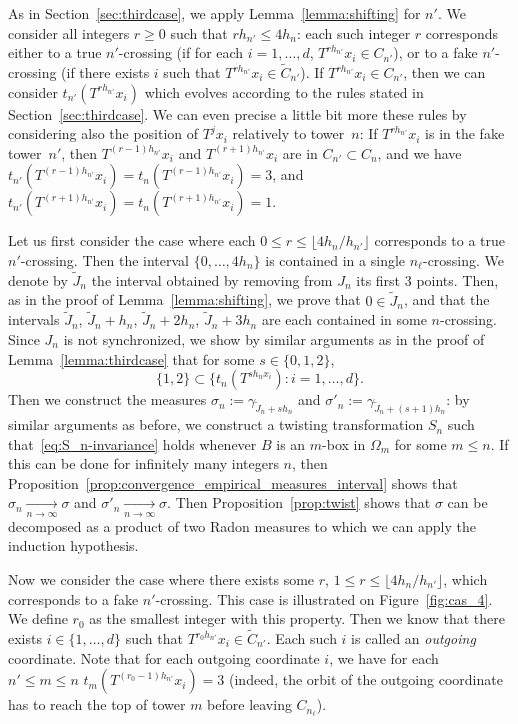 \documentclass[AHL,Unicode,longabstracts]{cedram}
\newcommand{\egdef}{:=}
\newcommand{\tend}[3][]{\xrightarrow[#2\to#3]{#1}}
\newcommand{\ovC}{\Omega}
\begin{document}
As in Section~\ref{sec:thirdcase}, we apply Lemma~\ref{lemma:shifting} for $n'$. We consider all integers $r\ge 0$ such that $rh_{n'}\le 4 h_n$: each such integer $r$ corresponds either to a true $n'$-crossing (if for each $i=1,\ldots,d$, $T^{rh_{n'}}x_i\in C_{n'}$), or to a fake $n'$-crossing (if there exists $i$ such that $T^{rh_{n'}}x_i\in \tilde C_{n'}$). If $T^{rh_{n'}}x_i\in C_{n'}$, then we can consider $t_{n'}(T^{rh_{n'}}x_i)$ which evolves according to the rules stated in Section~\ref{sec:thirdcase}. We can even precise a little bit more these rules by considering also the position of $T^jx_i$ relatively to tower~$n$: If $T^{rh_{n'}}x_i$ is in the fake tower~${n'}$, then $T^{(r-1)h_{n'}}x_i$ and $T^{(r+1)h_{n'}}x_i$ are in $C_{n'}\subset C_n$, and we have $t_{n'}(T^{(r-1)h_{n'}}x_i)=t_n(T^{(r-1)h_{n'}}x_i)=3$, and $t_{n'}(T^{(r+1)h_{n'}}x_i)={t_n(T^{(r+1)h_{n'}}x_i)=1}$.


Let us first consider the case where each $0\le r\le \lfloor 4h_n/h_{n'}\rfloor$ corresponds to a true $n'$-crossing. Then the interval $\{0,\ldots,4h_n\}$ is contained in a single $n_\ell$-crossing. We denote by $\tilde J_n$ the interval obtained by removing from $J_n$ its first 3 points. Then, as in the proof of Lemma~\ref{lemma:shifting}, we prove that $0\in \tilde J_n$, and that the intervals $\tilde J_n$, $\tilde J_n+h_n$, $\tilde J_n+2h_n$, $\tilde J_n+3h_n$ are each contained in some $n$-crossing. Since $J_n$ is not synchronized, we show by similar arguments as in the proof of Lemma~\ref{lemma:thirdcase} that for some $s\in\{0,1,2\}$,
\[
\{1,2\}\subset\bigl\{ t_n(T^{sh_nx_i}) : i=1,\ldots,d \bigr\}.
\]
Then we construct the measures $\sigma_n\egdef\gamma_{\tilde J_n+sh_n}$ and $\sigma'_n \egdef\gamma_{\tilde J_n+(s+1)h_n}$: by similar arguments as before, we construct a twisting transformation $S_n$ such that~\eqref{eq:S_n-invariance} holds whenever $B$ is an $m$-box in $\ovC_m$ for some $m\le n$. If this can be done for infinitely many integers $n$, then Proposition~\ref{prop:convergence_empirical_measures_interval} shows that $\sigma_n\tend{n}{\infty}\sigma$ and $\sigma'_n\tend{n}{\infty}\sigma$. Then Proposition~\ref{prop:twist} shows that $\sigma$ can be decomposed as a product of two Radon measures to which we can apply the induction hypothesis.

Now we consider the case where there exists some $r$, $1\le r\le \lfloor 4h_n/h_{n'}\rfloor$, which corresponds to a fake $n'$-crossing. This case is illustrated on Figure~\ref{fig:cas_4}. We define $r_0$ as the smallest integer with this property. Then we know that there exists $i\in\{1,\ldots,d\}$ such that $T^{r_0h_{n'}}x_i\in \tilde C_{n'}$. Each such $i$ is called an \emph{outgoing} coordinate. Note that for each outgoing coordinate $i$, we have for each $n'\le m\le n$ $t_m(T^{(r_0-1)h_{n'}}x_i)=3$ (indeed, the orbit of the outgoing coordinate has to reach the top of tower $m$ before leaving $C_{n_\ell}$).
\end{document}
